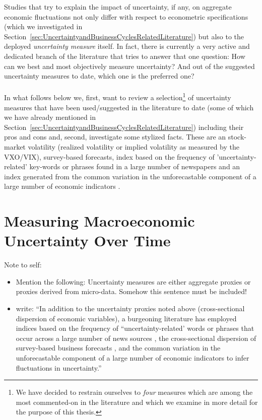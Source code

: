 \documentclass[a4paper,11pt,listof=nochaptergap,oneside,pointednumbers,bibtotoc,bigheadings,liststotoc]{scrbook}
\theoremstyle{mysatz}
\theoremstyle{mydefinition}
\theoremstyle{mybemerkung}
\begin{document}
Studies that try to explain the impact of uncertainty, if any, on aggregate economic fluctuations not only differ with respect to econometric specifications (which we investigated in Section~\ref{sec:UncertaintyandBusinessCyclesRelatedLiterature}) but also to the deployed \textit{uncertainty measure} itself. In fact, there is currently a very active and dedicated branch of the literature that tries to answer that one question: How can we best and most objectively measure uncertainty? And out of the suggested uncertainty measures to date, which one is the preferred one?\\
\\
In what follows below we, first, want to review a selection\footnote{We have decided to restrain ourselves to \textit{four} measures which are among the most commented-on in the literature and which we examine in more detail for the purpose of this thesis.} of uncertainty measures that have been used/suggested in the literature to date (some of which we have already mentioned in Section~\ref{sec:UncertaintyandBusinessCyclesRelatedLiterature}) including their pros and cons and, second, investigate some stylized facts. These are an stock-market volatility (realized volatility or implied volatility as measured by the VXO/VIX), survey-based forecasts, index based on the frequency of 'uncertainty-related' key-words or phrases found in a large number of newspapers \citep{bakeretal:15} and an index generated from the common variation in the unforecastable component of a large number of economic indicators \citep{juradoetal:15}.


\section{Measuring Macroeconomic Uncertainty Over Time}
\label{sec:MeasuringUncertainty}
\begingroup
    \fontsize{8pt}{12pt}\selectfont
    Note to self:
\begin{itemize}
	\item  Mention the following: Uncertainty measures are either aggregate proxies or proxies derived from micro-data. Somehow this sentence must be included! 
	\item \citet{gilchristetal:14} write: ``In addition to the uncertainty proxies noted above (cross-sectional dispersion of economic variables), a burgeoning literature has employed indices based on the frequency of ``uncertainty-related' words or phrases that occur across a large number of news sources \citep{bakeretal:15}, the cross-sectional dispersion of survey-based business forecasts \citep{bachmannetal:13}, and the common variation in the unforecastable component of a large number of economic indicators \citep{juradoetal:15} to infer fluctuations in uncertainty.''
\end{itemize}
\endgroup
\end{document}
